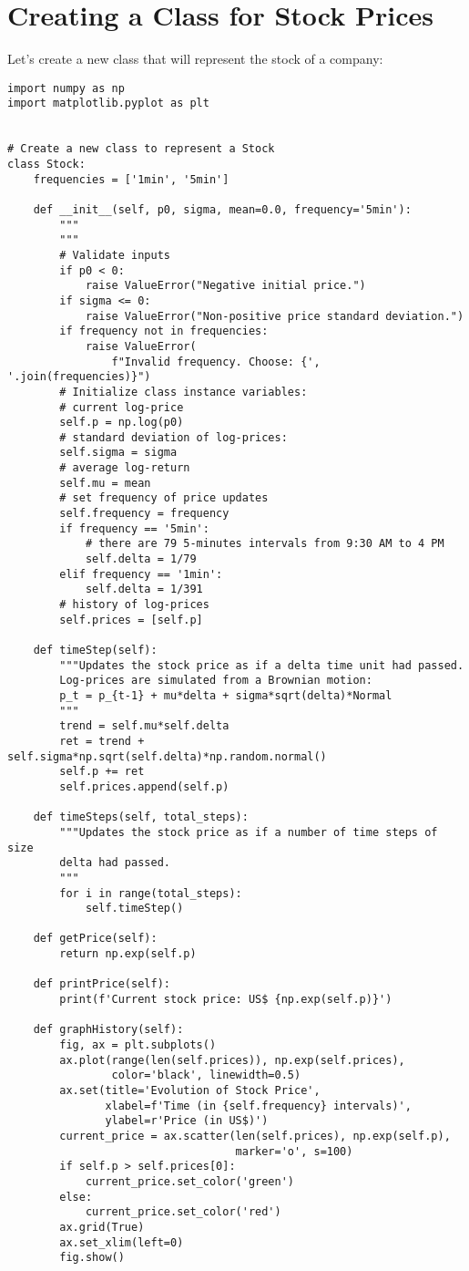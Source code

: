 \documentclass[12pt, a4paper]{article}
\begin{document}
\section{Creating a Class for Stock Prices}
\label{sec:org9842798}
Let's create a new class that will represent the stock of a company:
\lstset{language=jupyter-python,label= ,caption= ,captionpos=b,numbers=none}
\begin{lstlisting}
import numpy as np
import matplotlib.pyplot as plt


# Create a new class to represent a Stock
class Stock:
    frequencies = ['1min', '5min']

    def __init__(self, p0, sigma, mean=0.0, frequency='5min'):
        """
        """
        # Validate inputs
        if p0 < 0:
            raise ValueError("Negative initial price.")
        if sigma <= 0:
            raise ValueError("Non-positive price standard deviation.")
        if frequency not in frequencies:
            raise ValueError(
                f"Invalid frequency. Choose: {', '.join(frequencies)}")
        # Initialize class instance variables:
        # current log-price
        self.p = np.log(p0)
        # standard deviation of log-prices:
        self.sigma = sigma
        # average log-return
        self.mu = mean
        # set frequency of price updates
        self.frequency = frequency
        if frequency == '5min':
            # there are 79 5-minutes intervals from 9:30 AM to 4 PM
            self.delta = 1/79
        elif frequency == '1min':
            self.delta = 1/391
        # history of log-prices
        self.prices = [self.p]

    def timeStep(self):
        """Updates the stock price as if a delta time unit had passed.
        Log-prices are simulated from a Brownian motion:
        p_t = p_{t-1} + mu*delta + sigma*sqrt(delta)*Normal
        """
        trend = self.mu*self.delta
        ret = trend + self.sigma*np.sqrt(self.delta)*np.random.normal()
        self.p += ret
        self.prices.append(self.p)

    def timeSteps(self, total_steps):
        """Updates the stock price as if a number of time steps of size
        delta had passed.
        """
        for i in range(total_steps):
            self.timeStep()

    def getPrice(self):
        return np.exp(self.p)

    def printPrice(self):
        print(f'Current stock price: US$ {np.exp(self.p)}')

    def graphHistory(self):
        fig, ax = plt.subplots()
        ax.plot(range(len(self.prices)), np.exp(self.prices),
                color='black', linewidth=0.5)
        ax.set(title='Evolution of Stock Price',
               xlabel=f'Time (in {self.frequency} intervals)',
               ylabel=r'Price (in US$)')
        current_price = ax.scatter(len(self.prices), np.exp(self.p),
                                   marker='o', s=100)
        if self.p > self.prices[0]:
            current_price.set_color('green')
        else:
            current_price.set_color('red')
        ax.grid(True)
        ax.set_xlim(left=0)
        fig.show()
\end{lstlisting}
\end{document}
